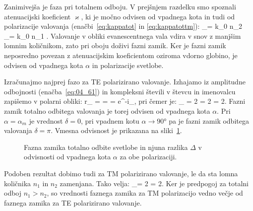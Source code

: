 Zanimivejša je faza pri totalnem odboju. V prejšnjem razdelku smo spoznali atenuacijski koeficient
$\varkappa$, ki je močno odvisen od vpadnega kota in tudi od polarizacije valovanja (enačbi~\ref{eq:kappatot} 
in \ref{eq:kappatottm}):
\beq
\varkappa_{}= k_0 n_2  
\qquad {}\qquad
\varkappa_{}= k_0 n_1 .
\label{eq:04_83}
\eeq
Valovanje v obliki evanescentnega vala vdira v snov z manjšim lomnim količnikom, zato
pri oboju doživi fazni zamik. Ker je fazni zamik neposredno povezan z atenuacijskim
koeficientom oziroma vdorno globino, je odvisen od vpadnega kota $\alpha$ in polarizacije svetlobe. 


Izračunajmo najprej fazo za TE polarizirano valovanje. Izhajamo iz amplitudne odbojnosti (enačba~\ref{eq:04_61})
in kompleksni števili v števcu in imenovalcu zapišemo v polarni obliki:
\beq
r_ =  = 
= e^{-i\delta_},
\label{eq:04_84}
\eeq
pri čemer je:
\beq
\delta_ = 2\arctan{} = 2\arctan{} = 
2\arctan{}.
\label{eq:04_85}
\eeq
Fazni zamik totalno odbitega valovanja je torej odvisen od vpadnega kota $\alpha$. 
Pri $\alpha = \alpha_m$ je vrednost $\delta=0$, pri vpadnem kotu $\alpha \to 90\si{\degree}$ pa je
fazni zamik odbitega valovanja $\delta = \pi$. Vmesna odvisnost je prikazana na sliki~\ref{fig:04_faza}.
\begin{figure}[ht]
\centering
\def\svgwidth{80truemm} 

\caption{Fazna zamika totalno odbite svetlobe in 
njuna razlika $\Delta$ v odvisnosti od vpadnega kota $\alpha$ za obe polarizaciji.}
\label{fig:04_faza}
\end{figure}

Podoben rezultat dobimo tudi za TM polarizirano valovanje, le da sta lomna količnika $n_1$ in $n_2$
zamenjana. Tako velja:
\beq
\delta_= 2\arctan{} = 2\arctan{}.
\label{eq:04_86}
\eeq
Ker je predpogoj za totalni odboj $n_1 > n_2$, so vrednosti faznega zamika za 
TM polarizacijo vedno večje od faznega zamika za TE polarizirano
valovanje. 


